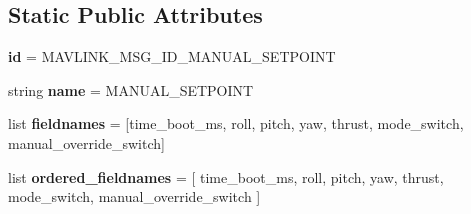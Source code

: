 \subsection*{Static Public Attributes}
\begin{DoxyCompactItemize}
\item 
\mbox{\label{classpymavlink_1_1dialects_1_1v10_1_1MAVLink__manual__setpoint__message_ad652c65d2c5ac8f225fb7993ab94673e}} 
{\bfseries id} = M\+A\+V\+L\+I\+N\+K\+\_\+\+M\+S\+G\+\_\+\+I\+D\+\_\+\+M\+A\+N\+U\+A\+L\+\_\+\+S\+E\+T\+P\+O\+I\+NT
\item 
\mbox{\label{classpymavlink_1_1dialects_1_1v10_1_1MAVLink__manual__setpoint__message_aa2c44876203a76f0eea809bb14a713a0}} 
string {\bfseries name} = \textquotesingle{}M\+A\+N\+U\+A\+L\+\_\+\+S\+E\+T\+P\+O\+I\+NT\textquotesingle{}
\item 
\mbox{\label{classpymavlink_1_1dialects_1_1v10_1_1MAVLink__manual__setpoint__message_a005e5d67d56ddaed87975e347c0550d7}} 
list {\bfseries fieldnames} = \mbox{[}\textquotesingle{}time\+\_\+boot\+\_\+ms\textquotesingle{}, \textquotesingle{}roll\textquotesingle{}, \textquotesingle{}pitch\textquotesingle{}, \textquotesingle{}yaw\textquotesingle{}, \textquotesingle{}thrust\textquotesingle{}, \textquotesingle{}mode\+\_\+switch\textquotesingle{}, \textquotesingle{}manual\+\_\+override\+\_\+switch\textquotesingle{}\mbox{]}
\item 
\mbox{\label{classpymavlink_1_1dialects_1_1v10_1_1MAVLink__manual__setpoint__message_a134fc3f7835c532a3c0f27aac394e0f7}} 
list {\bfseries ordered\+\_\+fieldnames} = \mbox{[} \textquotesingle{}time\+\_\+boot\+\_\+ms\textquotesingle{}, \textquotesingle{}roll\textquotesingle{}, \textquotesingle{}pitch\textquotesingle{}, \textquotesingle{}yaw\textquotesingle{}, \textquotesingle{}thrust\textquotesingle{}, \textquotesingle{}mode\+\_\+switch\textquotesingle{}, \textquotesingle{}manual\+\_\+override\+\_\+switch\textquotesingle{} \mbox{]}
\item 
\mbox{\label{classpymavlink_1_1dialects_1_1v10_1_1MAVLink__manual__setpoint__message_a8db5a32c509bcaab6290faf9ef6d943e}} 

\end{DoxyCompactItemize}
